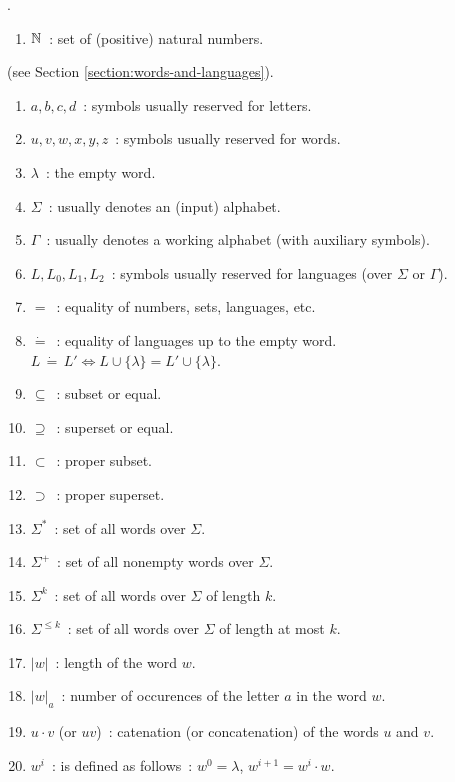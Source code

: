 
.

\begin{enumerate}[]
\item $\mathbb{N}$\ : set of (positive) natural numbers.
\end{enumerate}

 (see Section \ref{section:words-and-languages}).

\begin{enumerate}[]
\item $a, b, c, d$\ : symbols usually reserved for letters.
\item $u, v, w, x, y, z$\ : symbols usually reserved for words.
\item $\lambda$\ : the empty word.
\item $\Sigma$\ : usually denotes an (input) alphabet.
\item $\Gamma$\ : usually denotes a working alphabet (with auxiliary symbols).
\item $L, L_0, L_1, L_2$\ : symbols usually reserved for languages (over $\Sigma$ or $\Gamma$).
\item $=$\ : equality of numbers, sets, languages, etc.
\item $\dot{=}$\ : equality of languages up to the empty word. $L\, \dot{=}\, L' \Leftrightarrow L \cup \{\lambda\} = L' \cup \{\lambda\}$.
\item $\subseteq$\ : subset or equal.
\item $\supseteq$\ : superset or equal.
\item $\subset$\ : proper subset.
\item $\supset$\ : proper superset.
\item $\Sigma^*$\ : set of all words over $\Sigma$.
\item $\Sigma^+$\ : set of all nonempty words over $\Sigma$.
\item $\Sigma^k$\ : set of all words over $\Sigma$ of length $k$.
\item $\Sigma^{\le k}$\ : set of all words over $\Sigma$ of length at most $k$.
\item $|w|$\ : length of the word $w$.
\item $|w|_a$\ : number of occurences of the letter $a$ in the word $w$.
\item $u \cdot v$ (or $uv$)\ : catenation (or concatenation) of the words $u$ and $v$.
\item $w^i$\ : is defined as follows\ : $w^0 = \lambda$, $w^{i+1} = w^i \cdot w$.

\end{enumerate}
